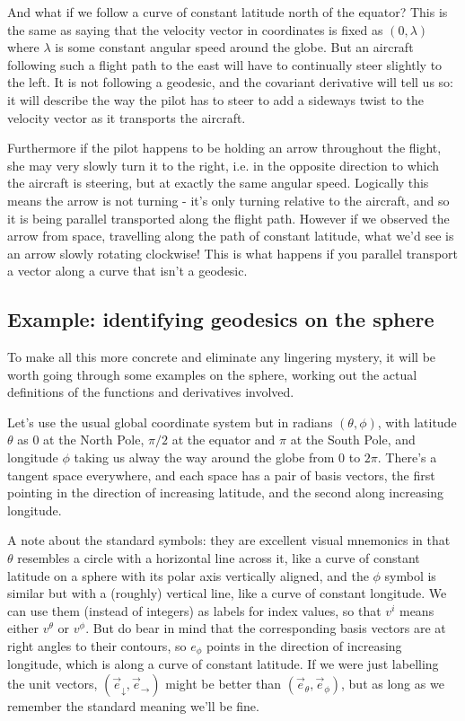And what if we follow a curve of constant latitude north of the equator? This is the same as saying that the velocity vector in coordinates is fixed as $(0, \lambda)$ where $\lambda$ is some constant angular speed around the globe. But an aircraft following such a flight path to the east will have to continually steer slightly to the left. It is not following a geodesic, and the covariant derivative will tell us so: it will describe the way the pilot has to steer to add a sideways twist to the velocity vector as it transports the aircraft.

Furthermore if the pilot happens to be holding an arrow throughout the flight, she may very slowly turn it to the right, i.e. in the opposite direction to which the aircraft is steering, but at exactly the same angular speed. Logically this means the arrow is not turning - it's only turning relative to the aircraft, and so it is being parallel transported along the flight path. However if we observed the arrow from space, travelling along the path of constant latitude, what we'd see is an arrow slowly rotating clockwise! This is what happens if you parallel transport a vector along a curve that isn't a geodesic.

\subsection{Example: identifying geodesics on the sphere}

To make all this more concrete and eliminate any lingering mystery, it will be worth going through some examples on the sphere, working out the actual definitions of the functions and derivatives involved.

Let's use the usual global coordinate system but in radians $(\theta, \phi)$, with latitude $\theta$ as $0$ at the North Pole, $\pi/2$ at the equator and $\pi$ at the South Pole, and longitude $\phi$ taking us alway the way around the globe from $0$ to $2\pi$. There's a tangent space everywhere, and each space has a pair of basis vectors, the first pointing in the direction of increasing latitude, and the second along increasing longitude.

A note about the standard symbols: they are excellent visual mnemonics in that $\theta$ resembles a circle with a horizontal line across it, like a curve of constant latitude on a sphere with its polar axis vertically aligned, and the $\phi$ symbol is similar but with a (roughly) vertical line, like a curve of constant longitude. We can use them (instead of integers) as labels for index values, so that $v^i$ means either $v^\theta$ or $v^\phi$. But do bear in mind that the corresponding basis vectors are at right angles to their contours, so $e_{\phi}$ points in the direction of increasing longitude, which is along a curve of constant latitude. If we were just labelling the unit vectors, $(\vec{e}_{\downarrow}, \vec{e}_{\rightarrow})$ might be better than $(\vec{e}_{\theta}, \vec{e}_{\phi})$, but as long as we remember the standard meaning we'll be fine.

